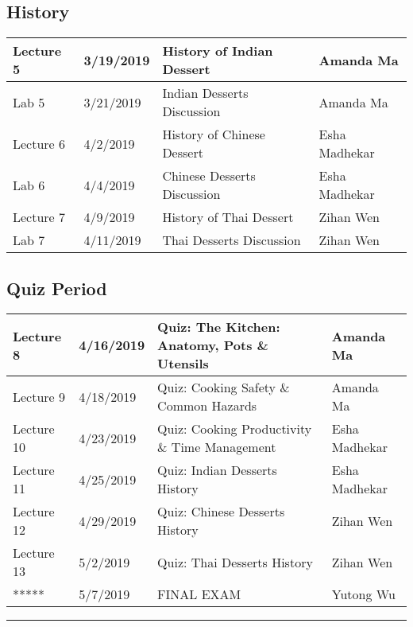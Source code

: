 \documentclass{article}
\begin{document}
\subsection*{History}
\vspace{0.5em} \begin{tabular}{|l|l|l|l|}
\hline 
Lecture 5 & 3/19/2019 & History of Indian Dessert & Amanda Ma\\
\hline
Lab 5 & 3/21/2019 & Indian Desserts Discussion & Amanda Ma\\
\hline
Lecture 6 & 4/2/2019 & History of Chinese Dessert & Esha Madhekar\\
\hline 
Lab 6 & 4/4/2019 & Chinese Desserts Discussion & Esha Madhekar\\
\hline
Lecture 7 & 4/9/2019 & History of Thai Dessert & Zihan Wen\\
\hline 
Lab 7 & 4/11/2019 & Thai Desserts Discussion & Zihan Wen \\
\hline
\end{tabular}

 \subsection*{Quiz Period}
 \vspace{0.5em} \begin{tabular}{|l|l|l|l|}
\hline 
Lecture 8 & 4/16/2019 & Quiz: The Kitchen: Anatomy, Pots \& Utensils & Amanda Ma\\
\hline
Lecture 9 & 4/18/2019 & Quiz: Cooking Safety \& Common Hazards & Amanda Ma\\
\hline
Lecture 10 & 4/23/2019 & Quiz: Cooking Productivity \& Time Management & Esha Madhekar\\
\hline 
Lecture 11 & 4/25/2019 & Quiz: Indian Desserts History & Esha Madhekar\\
\hline
Lecture 12 & 4/29/2019 & Quiz: Chinese Desserts History & Zihan Wen\\
\hline 
Lecture 13 & 5/2/2019 & Quiz: Thai Desserts History & Zihan Wen \\
\hline
***** & 5/7/2019 & FINAL EXAM & Yutong Wu \\
\hline
\end{tabular}

\vspace{1em}
\par\noindent\rule{\textwidth}{0.4pt}
  
\end{document}
